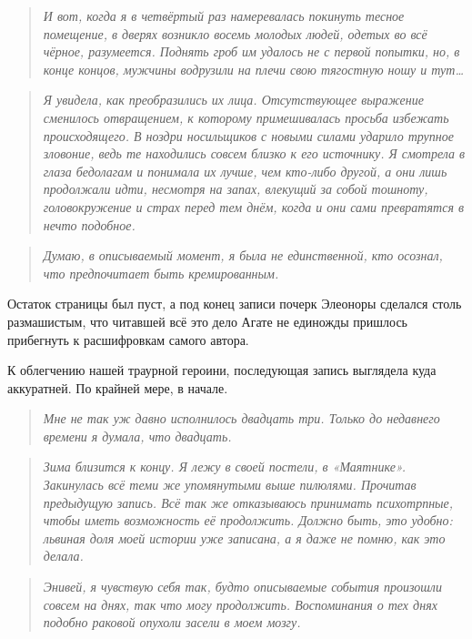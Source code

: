 \documentclass[
  a5paperpaper,
  DIV=11,
  numbers=noendperiod]{scrreprt}
\begin{document}
\begin{quote}
\emph{И вот, когда я в четвёртый раз намеревалась покинуть тесное
помещение, в дверях возникло восемь молодых людей, одетых во всё чёрное,
разумеется. Поднять гроб им удалось не с первой попытки, но, в конце
концов, мужчины водрузили на плечи свою тягостную ношу и тут\ldots{}}
\end{quote}

\begin{quote}
\emph{Я увидела, как преобразились их лица. Отсутствующее выражение
сменилось отвращением, к которому примешивалась просьба избежать
происходящего. В ноздри носильщиков с новыми силами ударило трупное
зловоние, ведь те находились совсем близко к его источнику. Я смотрела в
глаза бедолагам и понимала их лучше, чем кто-либо другой, а они лишь
продолжали идти, несмотря на запах, влекущий за собой тошноту,
головокружение и страх перед тем днём, когда и они сами превратятся в
нечто подобное.}
\end{quote}

\begin{quote}
\emph{Думаю, в описываемый момент, я была не единственной, кто осознал,
что предпочитает быть кремированным.}
\end{quote}

Остаток страницы был пуст, а под конец записи почерк Элеоноры сделался
столь размашистым, что читавшей всё это дело Агате не единожды пришлось
прибегнуть к расшифровкам самого автора.

К облегчению нашей траурной героини, последующая запись выглядела куда
аккуратней. По крайней мере, в начале.

\begin{quote}
\emph{Мне не так уж давно исполнилось двадцать три. Только до недавнего
времени я думала, что двадцать.}
\end{quote}

\begin{quote}
\emph{Зима близится к концу. Я лежу в своей постели, в «Маятнике».
Закинулась всё теми же упомянутыми выше пилюлями. Прочитав предыдущую
запись. Всё так же отказываюсь принимать психотрпные, чтобы иметь
возможность её продолжить. Должно быть, это удобно: львиная доля моей
истории уже записана, а я даже не помню, как это делала.}
\end{quote}

\begin{quote}
\emph{Энивей, я чувствую себя так, будто описываемые события произошли
совсем на днях, так что могу продолжить. Воспоминания о тех днях подобно
раковой опухоли засели в моем мозгу.}
\end{quote}
\end{document}
